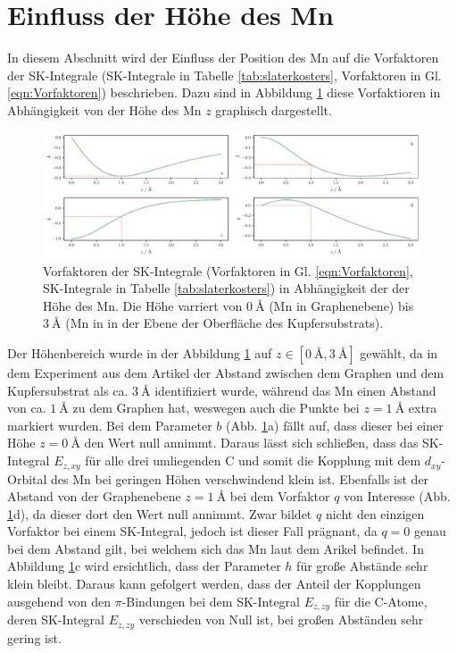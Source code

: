 \section{Einfluss der Höhe des Mn}
In diesem Abschnitt wird der Einfluss der Position des Mn auf die Vorfaktoren der SK-Integrale (SK-Integrale in Tabelle \ref{tab:slaterkosters}, Vorfaktoren in Gl. \eqref{eqn:Vorfaktoren}) beschrieben.
Dazu sind in Abbildung \ref{fig:Faktoreninz} diese Vorfaktioren in Abhängigkeit von der Höhe des Mn $z$ graphisch dargestellt.
\begin{figure}
    \centering
    \includegraphics[width = \textwidth]{Plots/Faktoreninz.pdf}
    \caption{Vorfaktoren der SK-Integrale (Vorfaktoren in Gl. \eqref{eqn:Vorfaktoren}, SK-Integrale in Tabelle \ref{tab:slaterkosters}) in Abhängigkeit der der Höhe des Mn.
    Die Höhe varriert von $\qty{0}{\angstrom}$ (Mn in Graphenebene) bis $\qty{3}{\angstrom}$ (Mn in in der Ebene der Oberfläche des Kupfersubstrats).}
    \label{fig:Faktoreninz}
\end{figure}
Der Höhenbereich wurde in der Abbildung \ref{fig:Faktoreninz} auf $z \in [\qty{0}{\angstrom}, \qty{3}{\angstrom}]$ gewählt, da in dem Experiment aus dem Artikel \cite{doi:10.1021/acsnano.1c00139} 
der Abstand zwischen dem Graphen und dem Kupfersubstrat als ca. $\qty{3}{\angstrom}$ identifiziert wurde, während das Mn einen Abstand von 
ca. $\qty{1}{\angstrom}$ zu dem Graphen hat, weswegen auch die Punkte bei $z = \qty{1}{\angstrom}$ extra markiert wurden.
Bei dem Parameter $b$ (Abb. \ref{fig:Faktoreninz}a) fällt auf, dass dieser bei einer Höhe $z = \qty{0}{\angstrom} $ den Wert null annimmt.
Daraus lässt sich schließen, dass das SK-Integral $E_{z,xy}$ für alle drei umliegenden C und somit die Kopplung mit 
dem $d_{xy}$-Orbital des Mn bei geringen Höhen verschwindend klein ist. 
Ebenfalls ist der Abstand von der Graphenebene $z=\qty{1}{\angstrom}$ bei dem Vorfaktor $q$ von Interesse (Abb. \ref{fig:Faktoreninz}d), da dieser dort den Wert null annimmt.
Zwar bildet $q$ nicht den einzigen Vorfaktor bei einem SK-Integral, jedoch ist dieser Fall prägnant, da $q=0$ genau bei dem Abstand gilt, 
bei welchem sich das Mn laut dem Arikel \cite{doi:10.1021/acsnano.1c00139} befindet.
In Abbildung \ref{fig:Faktoreninz}c wird ersichtlich, dass der Parameter $h$ für große Abstände sehr klein bleibt. 
Daraus kann gefolgert werden, dass der Anteil der Kopplungen ausgehend von den $\pi$-Bindungen bei dem SK-Integral $E_{z,zy}$ für die C-Atome, deren
SK-Integral $E_{z,zy}$ verschieden von Null ist, bei großen Abständen sehr gering ist.